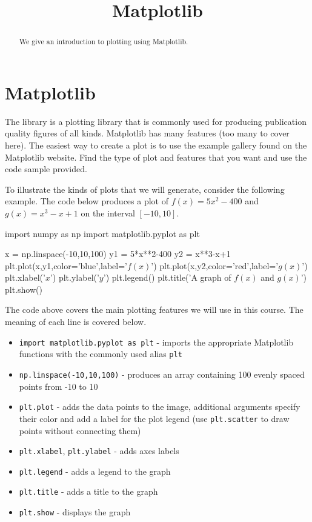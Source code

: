 \documentclass{ximera}
\title{Matplotlib}
\begin{document}
  
\begin{abstract}  
We give an introduction to plotting using Matplotlib.
\end{abstract}  
\maketitle

\section{Matplotlib}

The  library is a plotting library that is commonly used for producing publication quality figures of all kinds. Matplotlib has many features (too many to cover here). The easiest way to create a plot is to use the example gallery found on the Matplotlib website. Find the type of plot and features that you want and use the code sample provided.

To illustrate the kinds of plots that we will generate, consider the following example. The code below produces a plot of $f(x)=5x^2-400$ and $g(x)=x^3-x+1$ on the interval $[-10,10]$. 

\begin{sageOutput}
import numpy as np
import matplotlib.pyplot as plt

x = np.linspace(-10,10,100)
y1 = 5*x**2-400
y2 = x**3-x+1
plt.plot(x,y1,color='blue',label='$f(x)$')
plt.plot(x,y2,color='red',label='$g(x)$')
plt.xlabel('$x$')
plt.ylabel('$y$')
plt.legend()
plt.title('A graph of $f(x)$ and $g(x)$')
plt.show()
\end{sageOutput}

The code above covers the main plotting features we will use in this course. The meaning of each line is covered below.

\begin{itemize}
	\item \verb|import matplotlib.pyplot as plt| - imports the appropriate Matplotlib functions with the commonly used alias \verb|plt|
	\item \verb|np.linspace(-10,10,100)| - produces an array containing 100 evenly spaced points from -10 to 10
	\item \verb|plt.plot| - adds the data points to the image, additional arguments specify their color and add a label for the plot legend (use \verb|plt.scatter| to draw points without connecting them)
	\item \verb|plt.xlabel|, \verb|plt.ylabel| - adds axes labels
	\item \verb|plt.legend| - adds a legend to the graph
	\item \verb|plt.title| - adds a title to the graph
	\item \verb|plt.show| - displays the graph
\end{itemize}
\end{document}
